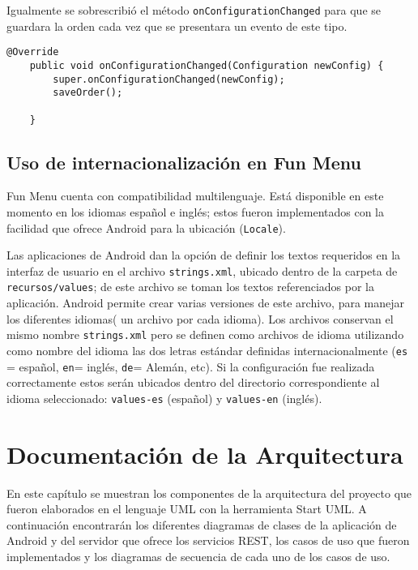 \documentclass[letterpaper,12pt]{book}
\begin{document}
\begin{mainmatter}
\begin{scriptsize}
\begin{lstlisting}
\end{lstlisting}
\end{scriptsize}

\normalfont

Igualmente se sobrescribió el método \texttt{onConfigurationChanged} para que
se guardara la orden cada vez que se presentara un evento de este tipo.


\begin{scriptsize}
\begin{lstlisting}
@Override
	public void onConfigurationChanged(Configuration newConfig) {
		super.onConfigurationChanged(newConfig); 
		saveOrder();   
		
	}
\end{lstlisting}
\end{scriptsize}

\section{Uso de internacionalización en Fun Menu}
Fun Menu cuenta con compatibilidad multilenguaje. Está disponible en
este momento en los idiomas español e inglés; estos fueron implementados
con la facilidad que ofrece Android para la ubicación (\texttt{Locale}). 

Las  aplicaciones de  Android  dan  la opción  de  definir los  textos
requeridos  en  la interfaz  de  usuario  en  el archivo  \texttt{strings.xml},
ubicado dentro  de la carpeta  de \texttt{recursos/values}; de este  archivo se
toman los textos referenciados  por la aplicación. Android
permite  crear varias versiones  de este archivo, para manejar  los diferentes
idiomas( un archivo por cada idioma). Los archivos
conservan el mismo nombre \texttt{strings.xml} pero se definen como archivos de idioma
utilizando como  nombre del idioma  las dos letras  estándar definidas
internacionalmente (\texttt{es} = español, \texttt{en}=  inglés, \texttt{de}= Alemán, etc). Si la
configuración fue realizada  correctamente estos serán ubicados dentro
del  directorio correspondiente  al  idioma  seleccionado: \texttt{values-es}
(español) y \texttt{values-en} (inglés).

\chapter{Documentación de la Arquitectura}
En este capítulo se muestran los componentes de la arquitectura del proyecto que fueron elaborados en el 
lenguaje UML con la herramienta Start UML. A continuación encontrarán los diferentes diagramas de clases 
de la aplicación de Android y del servidor que ofrece los servicios REST, los casos de uso que fueron 
implementados y los diagramas de secuencia de cada uno de los casos de uso.  


\end{mainmatter}
\end{document}
